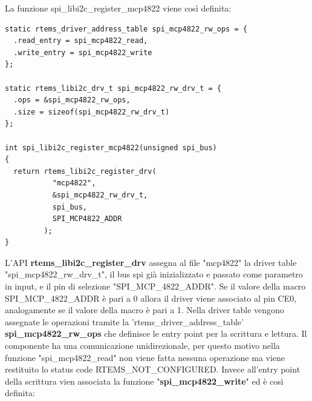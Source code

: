 \documentclass[12pt, a4paper, titlepage, oneside]{book}
\begin{document}
La funzione spi\_libi2c\_register\_mcp4822 viene così definita:
\begin{lstlisting}[style = CStyle]
static rtems_driver_address_table spi_mcp4822_rw_ops = {
  .read_entry = spi_mcp4822_read,
  .write_entry = spi_mcp4822_write
};

static rtems_libi2c_drv_t spi_mcp4822_rw_drv_t = {
  .ops = &spi_mcp4822_rw_ops,
  .size = sizeof(spi_mcp4822_rw_drv_t)
};

int spi_libi2c_register_mcp4822(unsigned spi_bus)
{
  return rtems_libi2c_register_drv(
           "mcp4822",
           &spi_mcp4822_rw_drv_t,
           spi_bus,
           SPI_MCP4822_ADDR
         );
}
\end{lstlisting}
L'API \textbf{rtems\_libi2c\_register\_drv} assegna al file "mcp4822" la driver table \newline "spi\_mcp4822\_rw\_drv\_t", il bus spi già inizializzato e passato come parametro in input, e il pin di selezione "SPI\_MCP\_4822\_ADDR". Se il valore della macro SPI\_MCP\_4822\_ADDR è pari a 0 allora il driver viene associato al pin CE0, analogamente se il valore della macro è pari a 1.\newline
Nella driver table vengono assegnate le operazioni tramite la 'rtems\_driver\_address\_table' \textbf{spi\_mcp4822\_rw\_ops} che definisce le entry point per la scrittura e lettura.\newline
Il componente ha una comunicazione unidirezionale, per questo motivo nella funzione  "spi\_mcp4822\_read" non viene fatta nessuna operazione ma viene restituito lo status code RTEMS\_NOT\_CONFIGURED.\newline
Invece all'entry point della scrittura vien associata la funzione "\textbf{spi\_mcp4822\_write}" ed è così definita:\newline
\end{document}

